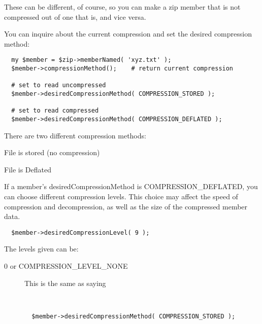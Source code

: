 \documentclass[]{article}
\begin{document}
These can be different, of course, so you can make a zip member that is
not compressed out of one that is, and vice versa.

You can inquire about the current compression and set the desired
compression method:

\begin{verbatim}
  my $member = $zip->memberNamed( 'xyz.txt' );
  $member->compressionMethod();    # return current compression
  
  # set to read uncompressed
  $member->desiredCompressionMethod( COMPRESSION_STORED );
  
  # set to read compressed
  $member->desiredCompressionMethod( COMPRESSION_DEFLATED );
\end{verbatim}

There are two different compression methods:

\begin{description}
\itemsep1pt\parskip0pt
\item[COMPRESSION\_STORED]
File is stored (no compression)
\end{description}

\begin{description}
\itemsep1pt\parskip0pt
\item[COMPRESSION\_DEFLATED]
File is Deflated
\end{description}


If a member's desiredCompressionMethod is COMPRESSION\_DEFLATED, you can
choose different compression levels. This choice may affect the speed of
compression and decompression, as well as the size of the compressed
member data.

\begin{verbatim}
  $member->desiredCompressionLevel( 9 );
\end{verbatim}

The levels given can be:

\begin{description}
\item[0 or COMPRESSION\_LEVEL\_NONE]
This is the same as saying

~

\begin{verbatim}
  $member->desiredCompressionMethod( COMPRESSION_STORED );
    
\end{verbatim}
\end{description}
\end{document}
